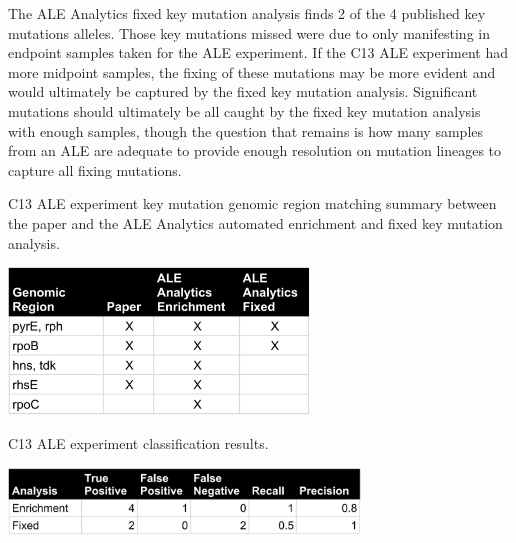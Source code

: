 \documentclass[12pt,final,masters,chapterheads]{ucsd}  %
\newcommand\todo[1]{\textcolor{red}{#1}}
\begin{document}
The ALE Analytics fixed key mutation analysis finds 2 of the 4 published key mutations alleles. Those key mutations missed were due to only manifesting in endpoint samples taken for the ALE experiment. If the C13 ALE experiment had more midpoint samples, the fixing of these mutations may be more evident and would ultimately be captured by the fixed key mutation analysis. Significant mutations should ultimately be all caught by the fixed key mutation analysis with enough samples, though the question that remains is how many samples from an ALE are adequate to provide enough resolution on mutation lineages to capture all fixing mutations.
\begin{table}[H]
  \caption{C13 ALE experiment {key mutation} genomic region matching summary between the paper and the ALE Analytics automated enrichment and fixed key mutation analysis.}
  \centering
  \includegraphics[width=0.6\textwidth]{c13_key_mutation_regions.png}
\end{table}
\begin{table}[H]
  \caption{C13 ALE experiment classification results.}
  \centering
  \includegraphics[width=0.7\textwidth]{c13_precision_recall.png}
\end{table}
\end{document}
